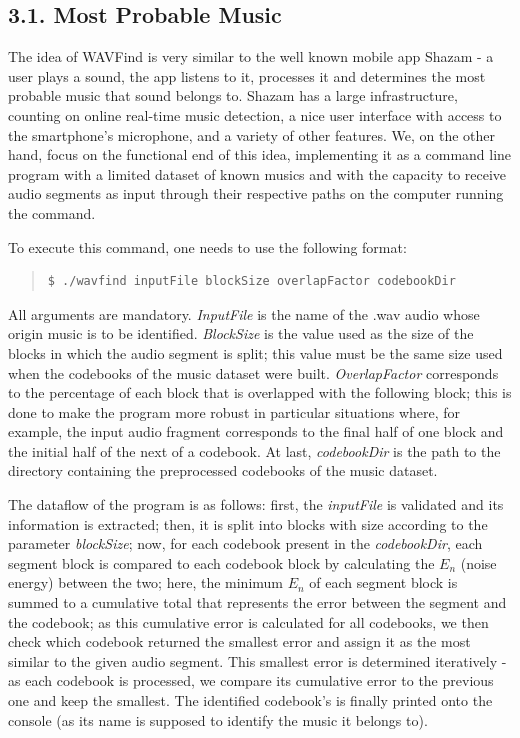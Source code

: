 \documentclass[12pt]{article}
\begin{document}
\subsection*{3.1. Most Probable Music}

The idea of WAVFind is very similar to the well known mobile app Shazam 
\cite{shazam} - a user plays a sound, the app listens to it, processes it and
determines the most probable music that sound belongs to.
Shazam has a large infrastructure, counting on online real-time music detection,
a nice user interface with access to the smartphone's microphone, and a variety
of other features.
We, on the other hand, focus on the functional end of this idea, implementing
it as a command line program with a limited dataset of known musics and with
the capacity to receive audio segments as input through their respective paths 
on the computer running the command.

To execute this command, one needs to use the following format:

\begingroup
\addtolength\leftmargini{-0.4in}
\begin{quote}
\begin{verbatim}
$ ./wavfind inputFile blockSize overlapFactor codebookDir
\end{verbatim}
\end{quote}
\endgroup

All arguments are mandatory. 
{\it InputFile\/} is the name of the .wav audio whose origin music is to be identified.
{\it BlockSize\/} is the value used as the size of the blocks in which the audio 
segment is split; this value must be the same size used when the codebooks of 
the music dataset were built.
{\it OverlapFactor\/} corresponds to the percentage of each block that is 
overlapped with the following block; this is done to make the program more 
robust in particular situations where, for example, the input audio fragment 
corresponds to the final half of one block and the initial half of the next of a 
codebook.
At last, {\it codebookDir\/} is the path to the directory containing the 
preprocessed codebooks of the music dataset.

The dataflow of the program is as follows:
first, the {\it inputFile\/} is validated and its information is extracted; 
then, it is split into blocks with size according to the parameter {\it blockSize\/}; 
now, for each codebook present in the {\it codebookDir\/}, each segment block 
is compared to each codebook block by calculating the $E_n$ (noise energy) 
between the two;
here, the minimum $E_n$ of each segment block is summed to a cumulative total
that represents the error between the segment and the codebook;
as this cumulative error is calculated for all codebooks, we then check which 
codebook returned the smallest error and assign it as the most similar to the
given audio segment.
This smallest error is determined iteratively - as each codebook is processed, 
we compare its cumulative error to the previous one and keep the smallest.
The identified codebook's is finally printed onto the console (as its name is 
supposed to identify the music it belongs to).
\end{document}
